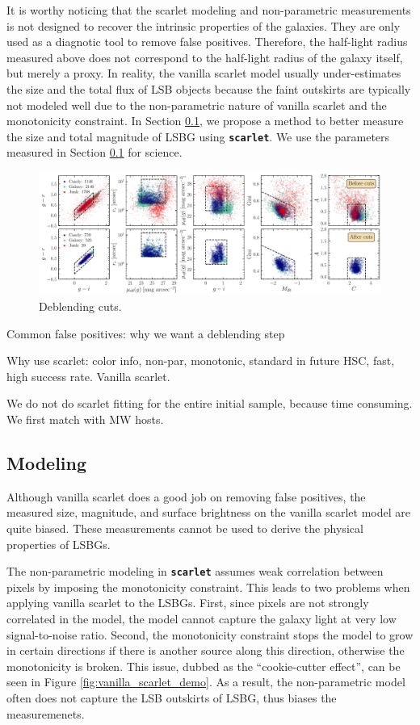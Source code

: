 \documentclass[twocolumn,astrosymb,twocolappendix]{aastex631}
\newcommand{\code}[1]{\textbf{\texttt{#1}}}
\begin{document}
\begin{CJK*}{UTF8}{gbsn}
It is worthy noticing that the scarlet modeling and non-parametric measurements is not designed to recover the intrinsic properties of the galaxies. They are only used as a diagnotic tool to remove false positives. Therefore, the half-light radius measured above does not correspond to the half-light radius of the galaxy itself, but merely a proxy. In reality, the vanilla scarlet model usually under-estimates the size and the total flux of LSB objects because the faint outskirts are typically not modeled well due to the non-parametric nature of vanilla scarlet and the monotonicity constraint. In Section \ref{sec:modeling}, we propose a method to better measure the size and total magnitude of LSBG using \code{scarlet}. We use the parameters measured in Section \ref{sec:modeling} for science. 

\begin{figure}
	\vbox{ 
		\centering
		\includegraphics[width=1.0\linewidth]{deblending_cuts.pdf}
	}
	\caption{Deblending cuts.}
	\label{fig:deblending_cuts}
\end{figure}


Common false positives: why we want a deblending step

Why use scarlet: color info, non-par, monotonic, standard in future HSC, fast, high success rate. Vanilla scarlet.

We do not do scarlet fitting for the entire initial sample, because time consuming. We first match with MW hosts. 


\subsection{Modeling}\label{sec:modeling}
Although vanilla scarlet does a good job on removing false positives, the measured size, magnitude, and surface brightness on the vanilla scarlet model are quite biased. These measurements cannot be used to derive the physical properties of LSBGs. 

The non-parametric modeling in \code{scarlet} assumes weak correlation between pixels by imposing the monotonicity constraint. This leads to two problems when applying vanilla scarlet to the LSBGs. First, since pixels are not strongly correlated in the model, the model cannot capture the galaxy light at very low signal-to-noise ratio. Second, the monotonicity constraint stops the model to grow in certain directions if there is another source along this direction, otherwise the monotonicity is broken. This issue, dubbed as the ``cookie-cutter effect'', can be seen in Figure \ref{fig:vanilla_scarlet_demo}. As a result, the non-parametric model often does not capture the LSB outskirts of LSBG, thus biases the measuremenets. 


\end{CJK*}
\end{document}
